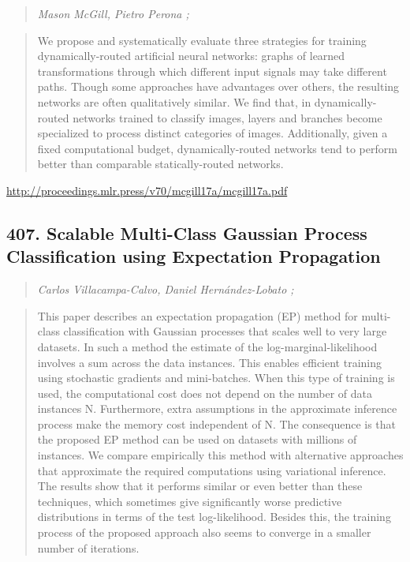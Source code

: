 \documentclass{article}
\begin{document}
\begin{quote}
\footnotesize{\textit{Mason McGill, Pietro Perona ;}}

\end{quote}

\begin{quote}
    We propose and systematically evaluate three strategies for training dynamically-routed artificial neural networks: graphs of learned transformations through which different input signals may take different paths. Though some approaches have advantages over others, the resulting networks are often qualitatively similar. We find that, in dynamically-routed networks trained to classify images, layers and branches become specialized to process distinct categories of images. Additionally, given a fixed computational budget, dynamically-routed networks tend to perform better than comparable statically-routed networks.  
\end{quote}

\href{http://proceedings.mlr.press/v70/mcgill17a/mcgill17a.pdf}{http://proceedings.mlr.press/v70/mcgill17a/mcgill17a.pdf}

\subsection{407. Scalable Multi-Class Gaussian Process Classification using Expectation Propagation}

\begin{quote}
\footnotesize{\textit{Carlos Villacampa-Calvo, Daniel Hernández-Lobato ;}}

\end{quote}

\begin{quote}
    This paper describes an expectation propagation (EP) method for multi-class classification with Gaussian processes that scales well to very large datasets. In such a method the estimate of the log-marginal-likelihood involves a sum across the data instances. This enables efficient training using stochastic gradients and mini-batches. When this type of training is used, the computational cost does not depend on the number of data instances N. Furthermore, extra assumptions in the approximate inference process make the memory cost independent of N. The consequence is that the proposed EP method can be used on datasets with millions of instances. We compare empirically this method with alternative approaches that approximate the required computations using variational inference. The results show that it performs similar or even better than these techniques, which sometimes give significantly worse predictive distributions in terms of the test log-likelihood. Besides this, the training process of the proposed approach also seems to converge in a smaller number of iterations.  
\end{quote}
\end{document}
